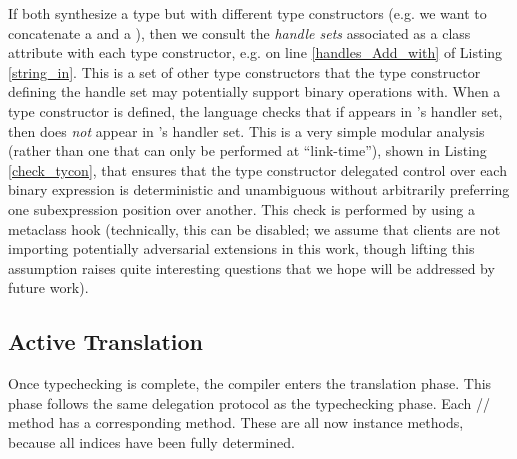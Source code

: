 If both synthesize a type but with different type constructors (e.g. we want to concatenate a  and a ), then we consult the \emph{handle sets} associated as a class attribute with each type constructor, e.g.  on line \ref{handles_Add_with} of Listing \ref{string_in}. This is a set of other type constructors that the type constructor defining the handle set may potentially support binary operations with. When a type constructor is defined, the language checks that if  appears in 's handler set, then  does \emph{not} appear in 's handler set. This is a very simple modular analysis (rather than one that can only be performed at ``link-time''), shown in Listing \ref{check_tycon}, that ensures that the type constructor delegated control over each binary expression is deterministic and  unambiguous without arbitrarily preferring one subexpression position over another. This check is performed  by using a metaclass hook (technically, this can be disabled; we assume that clients are not importing potentially adversarial extensions in this work, though lifting this assumption raises quite interesting questions that we hope will be addressed by future work).

\subsection{Active Translation}
Once typechecking is complete, the compiler enters the translation phase. %
This phase follows the same delegation protocol as the typechecking phase. Each // method has a corresponding  method. These are all now instance methods, because all indices have been fully determined. 

